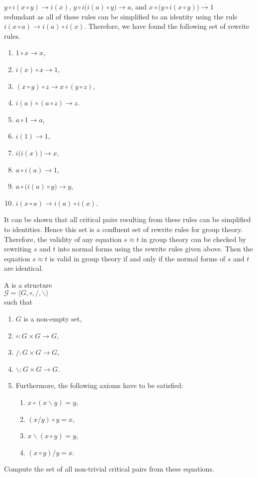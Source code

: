 \hspace*{1.3cm}
$y \circ i(x \circ y) \rightarrow i(x)$, \quad
$y \circ i\bigl(i(a)\circ y\bigr) \rightarrow a$, \quad and \quad
$x \circ \bigl(y \circ i(x \circ y)\bigr) \rightarrow 1$
\\[0.2cm]
redundant as all of these rules can be simplified to an identity using the rule $i(x \circ a) \rightarrow i(a) \circ i(x)$.
Therefore, we have found the following set of rewrite rules.
\begin{enumerate}
\item $1 \circ x \rightarrow x$,
\item $i(x) \circ x \rightarrow 1$, 
\item $(x \circ y) \circ z \rightarrow x \circ (y \circ z)$,
\item $i(a) \circ (a \circ z) \rightarrow z$.
\item $a \circ 1 \rightarrow a$,
\item $i(1) \rightarrow 1$,
\item $i\bigl(i(x)\bigr) \rightarrow x$,
\item $a \circ i(a) \rightarrow 1$,
\item $a \circ \bigl(i(a) \circ y\bigr) \rightarrow y$,
\item $i(x \circ a) \rightarrow i(a) \circ i(x)$.
\end{enumerate}
It can be shown that all critical pairs resulting from these rules can be simplified to identities.  Hence this
set is a confluent set of rewrite rules for group theory.  Therefore, the validity of any equation $s \approx t$
in group theory can be checked by rewriting $s$ and $t$ into normal forms using the rewrite rules given  
above.  Then the equation $s \approx t$ is valid in group theory if and only if the normal forms of $s$ and $t$
are identical. 
\eoxs

\exercise
A  is a structure
\\[0.2cm]
\hspace*{1.3cm}
$ \mathcal{G} = \langle G, \circ, /, \backslash \rangle$
\\[0.2cm]
such that
\begin{enumerate}
\item $G$ is a non-empty set,
\item $\circ: G \times G \rightarrow G$,
\item $/: G \times G \rightarrow G$,
\item $\backslash: G \times G \rightarrow G$.
\item Furthermore, the following axioms have to be satisfied:
      \begin{enumerate}
      \item $x \circ (x \backslash y) = y$,
      \item $(x / y) \circ y = x$,
      \item $x \backslash (x \circ y) = y$,
      \item $(x \circ y) /y = x$.
      \end{enumerate}  
\end{enumerate}
Compute the set of all non-trivial critical pairs from these equations.

